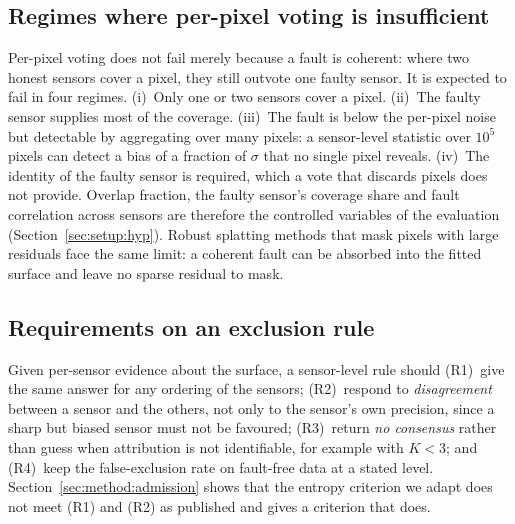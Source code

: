 \subsection{Regimes where per-pixel voting is insufficient}
\label{sec:form:regimes}
Per-pixel voting does not fail merely because a fault is coherent: where two
honest sensors cover a pixel, they still outvote one faulty sensor. It is
expected to fail in four regimes. (i)~Only one or two sensors cover a pixel.
(ii)~The faulty sensor supplies most of the coverage. (iii)~The fault is below
the per-pixel noise but detectable by aggregating over many pixels: a sensor-level
statistic over $10^{5}$ pixels can detect a bias of a fraction of $\sigma$ that no
single pixel reveals. (iv)~The identity of the faulty sensor is required, which a
vote that discards pixels does not provide. Overlap fraction, the faulty sensor's
coverage share and fault correlation across sensors are therefore the controlled
variables of the evaluation (Section~\ref{sec:setup:hyp}). Robust splatting
methods that mask pixels with large residuals \cite{gs_spotless,gs_robustsplat}
face the same limit: a coherent fault can be absorbed into the fitted surface and
leave no sparse residual to mask.

\subsection{Requirements on an exclusion rule}
\label{sec:form:requirements}
Given per-sensor evidence about the surface, a sensor-level rule should
(R1)~give the same answer for any ordering of the sensors; (R2)~respond to
\emph{disagreement} between a sensor and the others, not only to the sensor's own
precision, since a sharp but biased sensor must not be favoured; (R3)~return
\emph{no consensus} rather than guess when attribution is not identifiable, for
example with $K<3$; and (R4)~keep the false-exclusion rate on fault-free data at a
stated level. Section~\ref{sec:method:admission} shows that the entropy criterion
we adapt does not meet (R1) and (R2) as published and gives a criterion that does.
